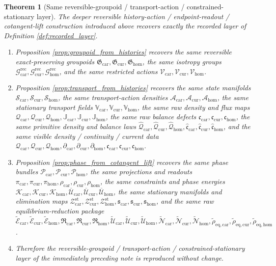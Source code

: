 \documentclass[11pt]{article}
\newcommand{\TensorDensity}{\mathcal Q_{\mathrm{car}}}
\newcommand{\CurDensity}{\mathcal Q_{\mathrm{cur}}}
\newcommand{\HomDensity}{\mathcal Q_{\mathrm{hom}}}
\newcommand{\TensorCont}{\partial_{\mathrm{car}}}
\newcommand{\CurCont}{\partial_{\mathrm{cur}}}
\newcommand{\HomCont}{\partial_{\mathrm{hom}}}
\newcommand{\TensorCurrent}{\mathfrak c_{\mathrm{car}}}
\newcommand{\CurCurrent}{\mathfrak c_{\mathrm{cur}}}
\newcommand{\HomCurrent}{\mathfrak c_{\mathrm{hom}}}
\newcommand{\TensorReconGroup}{\mathcal G_{\mathrm{car}}^{\mathrm{rec}}}
\newcommand{\CurReconGroup}{\mathcal G_{\mathrm{cur}}^{\mathrm{rec}}}
\newcommand{\HomReconGroup}{\mathcal G_{\mathrm{hom}}^{\mathrm{rec}}}
\newcommand{\TensorReconAct}{\mathscr V_{\mathrm{car}}}
\newcommand{\CurReconAct}{\mathscr V_{\mathrm{cur}}}
\newcommand{\HomReconAct}{\mathscr V_{\mathrm{hom}}}
\newcommand{\TensorStateManifold}{\mathcal S_{\mathrm{car}}}
\newcommand{\CurStateManifold}{\mathcal S_{\mathrm{cur}}}
\newcommand{\HomStateManifold}{\mathcal S_{\mathrm{hom}}}
\newcommand{\TensorRawDensity}{\boldsymbol{\mathcal Q}_{\mathrm{car}}}
\newcommand{\CurRawDensity}{\boldsymbol{\mathcal Q}_{\mathrm{cur}}}
\newcommand{\HomRawDensity}{\boldsymbol{\mathcal Q}_{\mathrm{hom}}}
\newcommand{\TensorTransport}{\mathbb V_{\mathrm{car}}}
\newcommand{\CurTransport}{\mathbb V_{\mathrm{cur}}}
\newcommand{\HomTransport}{\mathbb V_{\mathrm{hom}}}
\newcommand{\TensorFlux}{\mathbb J_{\mathrm{car}}}
\newcommand{\CurFlux}{\mathbb J_{\mathrm{cur}}}
\newcommand{\HomFlux}{\mathbb J_{\mathrm{hom}}}
\newcommand{\TensorRawBalance}{\boldsymbol{\mathfrak c}_{\mathrm{car}}}
\newcommand{\CurRawBalance}{\boldsymbol{\mathfrak c}_{\mathrm{cur}}}
\newcommand{\HomRawBalance}{\boldsymbol{\mathfrak c}_{\mathrm{hom}}}
\newcommand{\TensorPrimitiveDensity}{\widehat{\mathcal Q}_{\mathrm{car}}}
\newcommand{\CurPrimitiveDensity}{\widehat{\mathcal Q}_{\mathrm{cur}}}
\newcommand{\HomPrimitiveDensity}{\widehat{\mathcal Q}_{\mathrm{hom}}}
\newcommand{\TensorBalance}{\widehat{\mathfrak c}_{\mathrm{car}}}
\newcommand{\CurBalance}{\widehat{\mathfrak c}_{\mathrm{cur}}}
\newcommand{\HomBalance}{\widehat{\mathfrak c}_{\mathrm{hom}}}
\newcommand{\TensorRawEqClass}{\widetilde{\mathscr E}_{\mathrm{car}}}
\newcommand{\CurRawEqClass}{\widetilde{\mathscr E}_{\mathrm{cur}}}
\newcommand{\HomRawEqClass}{\widetilde{\mathscr E}_{\mathrm{hom}}}
\newcommand{\TensorEqReduce}{\mathfrak R_{\mathrm{car}}}
\newcommand{\CurEqReduce}{\mathfrak R_{\mathrm{cur}}}
\newcommand{\HomEqReduce}{\mathfrak R_{\mathrm{hom}}}
\newcommand{\TensorRawEnergy}{\widetilde{\mathcal U}_{\mathrm{car}}}
\newcommand{\CurRawEnergy}{\widetilde{\mathcal U}_{\mathrm{cur}}}
\newcommand{\HomRawEnergy}{\widetilde{\mathcal U}_{\mathrm{hom}}}
\newcommand{\TensorRawEqManifold}{\widetilde{\mathcal N}_{\mathrm{car}}}
\newcommand{\CurRawEqManifold}{\widetilde{\mathcal N}_{\mathrm{cur}}}
\newcommand{\HomRawEqManifold}{\widetilde{\mathcal N}_{\mathrm{hom}}}
\newcommand{\RawCarGap}{\widetilde\rho_{\mathrm{eq,car}}}
\newcommand{\RawCurGap}{\widetilde\rho_{\mathrm{eq,cur}}}
\newcommand{\RawHomGap}{\widetilde\rho_{\mathrm{eq,hom}}}
\newcommand{\TensorGroupoid}{\mathfrak G_{\mathrm{car}}}
\newcommand{\CurGroupoid}{\mathfrak G_{\mathrm{cur}}}
\newcommand{\HomGroupoid}{\mathfrak G_{\mathrm{hom}}}
\newcommand{\TensorActionDensity}{\mathscr A_{\mathrm{car}}}
\newcommand{\CurActionDensity}{\mathscr A_{\mathrm{cur}}}
\newcommand{\HomActionDensity}{\mathscr A_{\mathrm{hom}}}
\newcommand{\TensorPhaseClass}{\mathscr P_{\mathrm{car}}}
\newcommand{\CurPhaseClass}{\mathscr P_{\mathrm{cur}}}
\newcommand{\HomPhaseClass}{\mathscr P_{\mathrm{hom}}}
\newcommand{\TensorPhaseProj}{\pi_{\mathrm{car}}}
\newcommand{\CurPhaseProj}{\pi_{\mathrm{cur}}}
\newcommand{\HomPhaseProj}{\pi_{\mathrm{hom}}}
\newcommand{\TensorPhaseRead}{\rho_{\mathrm{car}}}
\newcommand{\CurPhaseRead}{\rho_{\mathrm{cur}}}
\newcommand{\HomPhaseRead}{\rho_{\mathrm{hom}}}
\newcommand{\TensorConstraint}{\mathcal K_{\mathrm{car}}}
\newcommand{\CurConstraint}{\mathcal K_{\mathrm{cur}}}
\newcommand{\HomConstraint}{\mathcal K_{\mathrm{hom}}}
\newcommand{\TensorPhaseEnergy}{\overline{\mathcal U}_{\mathrm{car}}}
\newcommand{\CurPhaseEnergy}{\overline{\mathcal U}_{\mathrm{cur}}}
\newcommand{\HomPhaseEnergy}{\overline{\mathcal U}_{\mathrm{hom}}}
\newcommand{\TensorStationaryManifold}{\mathcal Z_{\mathrm{car}}^{\mathrm{st}}}
\newcommand{\CurStationaryManifold}{\mathcal Z_{\mathrm{cur}}^{\mathrm{st}}}
\newcommand{\HomStationaryManifold}{\mathcal Z_{\mathrm{hom}}^{\mathrm{st}}}
\newcommand{\TensorStationarySolve}{\mathfrak s_{\mathrm{car}}}
\newcommand{\CurStationarySolve}{\mathfrak s_{\mathrm{cur}}}
\newcommand{\HomStationarySolve}{\mathfrak s_{\mathrm{hom}}}
\newtheorem{theorem}{Theorem}
\begin{document}
\begin{theorem}[Same reversible-groupoid / transport-action / constrained-stationary layer]
\label{thm:same_layer}
The deeper reversible history-action / endpoint-readout / cotangent-lift construction introduced above recovers exactly the recorded layer of Definition \ref{def:recorded_layer}.
\begin{enumerate}
    \item Proposition \ref{prop:groupoid_from_histories} recovers the same reversible exact-preserving groupoids \(\TensorGroupoid,\CurGroupoid,\HomGroupoid\), the same isotropy groups \(\TensorReconGroup,\CurReconGroup,\HomReconGroup\), and the same restricted actions \(\TensorReconAct,\CurReconAct,\HomReconAct\).
    \item Proposition \ref{prop:transport_from_histories} recovers the same state manifolds \(\TensorStateManifold,\CurStateManifold,\HomStateManifold\), the same transport-action densities \(\TensorActionDensity,\CurActionDensity,\HomActionDensity\), the same stationary transport fields \(\TensorTransport,\CurTransport,\HomTransport\), the same raw density and flux maps \(\TensorRawDensity,\CurRawDensity,\HomRawDensity,\TensorFlux,\CurFlux,\HomFlux\), the same raw balance defects \(\TensorRawBalance,\CurRawBalance,\HomRawBalance\), the same primitive density and balance laws \(\TensorPrimitiveDensity,\CurPrimitiveDensity,\HomPrimitiveDensity,\TensorBalance,\CurBalance,\HomBalance\), and the same visible density / continuity / current data \(\TensorDensity,\CurDensity,\HomDensity,\TensorCont,\CurCont,\HomCont,\TensorCurrent,\CurCurrent,\HomCurrent\).
    \item Proposition \ref{prop:phase_from_cotangent_lift} recovers the same phase bundles \(\TensorPhaseClass,\CurPhaseClass,\HomPhaseClass\), the same projections and readouts \(\TensorPhaseProj,\CurPhaseProj,\HomPhaseProj,\TensorPhaseRead,\CurPhaseRead,\HomPhaseRead\), the same constraints and phase energies \(\TensorConstraint,\CurConstraint,\HomConstraint,\TensorPhaseEnergy,\CurPhaseEnergy,\HomPhaseEnergy\), the same stationary manifolds and elimination maps \(\TensorStationaryManifold,\CurStationaryManifold,\HomStationaryManifold,\TensorStationarySolve,\CurStationarySolve,\HomStationarySolve\), and the same raw equilibrium-reduction package \(\TensorRawEqClass,\CurRawEqClass,\HomRawEqClass,\TensorEqReduce,\CurEqReduce,\HomEqReduce,\TensorRawEnergy,\CurRawEnergy,\HomRawEnergy,\TensorRawEqManifold,\CurRawEqManifold,\HomRawEqManifold,\RawCarGap,\RawCurGap,\RawHomGap\).
    \item Therefore the reversible-groupoid / transport-action / constrained-stationary layer of the immediately preceding note is reproduced without change.
\end{enumerate}
\end{theorem}
\end{document}

